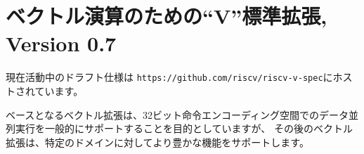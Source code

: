 \begin{comment}
\chapter{``V'' Standard Extension for Vector Operations, Version 0.7}
\end{comment}
\chapter{ベクトル演算のための``V''標準拡張, Version 0.7}
\label{sec:vector}

\begin{comment}
The current working group draft is hosted at {\tt
  https://github.com/riscv/riscv-v-spec}.
\end{comment}
現在活動中のドラフト仕様は {\tt https://github.com/riscv/riscv-v-spec}にホストされています。

\begin{commentary}
\begin{comment}
The base vector extension is intended to provide general support for
data-parallel execution within the 32-bit instruction encoding space,
with later vector extensions supporting richer functionality for
certain domains.
\end{comment}
ベースとなるベクトル拡張は、32ビット命令エンコーディング空間でのデータ並列実行を一般的にサポートすることを目的としていますが、
その後のベクトル拡張は、特定のドメインに対してより豊かな機能をサポートします。
\end{commentary}



